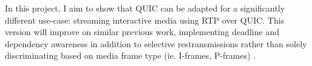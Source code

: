 \documentclass{mprop}
\begin{document}
In this project, I aim to show that QUIC can be adapted for a significantly different use-case: 
streaming interactive media using RTP over QUIC. This version will improve on similar previous 
work, implementing deadline and dependency awareness in addition to selective restransmissions 
rather than solely discriminating based on media frame type (ie. I-frames, P-frames) \cite
{Palmer2018}.





\end{document}
